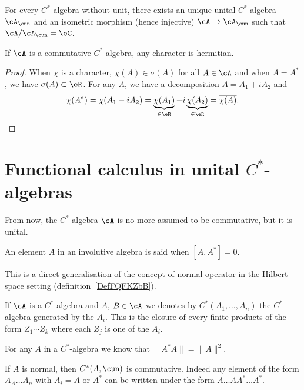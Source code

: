 \begin{proposition}
For every $C^*$-algebra without unit, there exists an unique unital $C^*$-algebra $\cA_{\cun}$ and an isometric morphism (hence injective) $\cA\to\cA_{\cun}$ such that $\cA/\cA_{\cun}=\eC$.
\label{prop_unitariz_csa}
\end{proposition}

\begin{proposition}
If $\cA$ is a commutative $C^*$-algebra, any character is hermitian.
\end{proposition}

\begin{proof}
When $\chi$ is a character, $\chi(A)\in\sigma(A)$ for all $A\in\cA$ and when $A=A^*$, we have $\sigma(A)\subset\eR$. For any $A$, we have a decomposition $A=A_1+iA_2$ and
\[
  \chi(A^*)=\chi(A_1-iA_2)=\underbrace{\chi(A_1)}_{\in\eR}-i\underbrace{\chi(A_2)}_{\in\eR}=\overline{ \chi(A) }.
\]
\end{proof}

\section{Functional calculus in unital \texorpdfstring{$C^*$}{C}-algebras}

From now, the $C^*$-algebra $\cA$ is no more assumed to be commutative, but it is unital.

\begin{definition}      \label{DefElemNormal}
    An element $A$ in an involutive algebra is said  when $[A,A^*]=0$.
\end{definition}
This is a direct generalisation of the concept of normal operator in the Hilbert space setting (definition~\ref{DefFQFKZbB}).

If $\cA$ is a $C^{*}$-algebra and $A$, $B\in\cA$ we denotes by $C^*(A_1,\ldots,A_n)$ the $C^{*}$-algebra generated by the $A_i$. This is the closure of every finite products of the form $Z_1\cdots Z_k$ where each $Z_j$ is one of the $A_i$.

For any $A$ in a $C^{*}$-algebra we know that $\|A^*A\|=\|A\|^2$.

If $A$ is normal, then $C^*(A,\cun)$ is commutative. Indeed any element of the form $A_A\ldots A_n$ with $A_i=A$ or $A^*$ can be written under the form $A\ldots AA^*\ldots A^*$.

